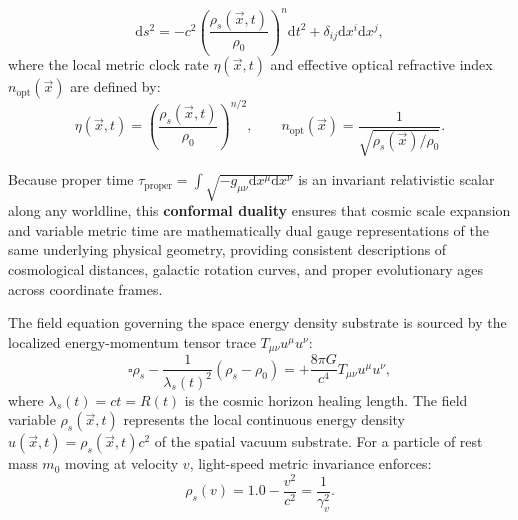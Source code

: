 \documentclass[aps,prd,reprint,superscriptaddress,nofootinbib,floatfix,amsmath,amssymb]{revtex4-2}
\begin{document}
\begin{enumerate}
    \begin{equation}
    \mathrm{d}s^2 = -c^2 \left( \frac{\rho_s(\vec{x}, t)}{\rho_0} \right)^n \mathrm{d}t^2 + \delta_{ij} \mathrm{d}x^i \mathrm{d}x^j,
    \label{eq:metric}
    \end{equation}
    where the local metric clock rate $\eta(\vec{x}, t)$ and effective optical refractive index $n_{\text{opt}}(\vec{x})$ are defined by:
    \begin{equation}
    \eta(\vec{x}, t) = \left(\frac{\rho_s(\vec{x}, t)}{\rho_0}\right)^{n/2}, \qquad n_{\text{opt}}(\vec{x}) = \frac{1}{\sqrt{\rho_s(\vec{x}) / \rho_0}}.
    \label{eq:clock_rate}
    \end{equation}
\end{enumerate}

Because proper time $\tau_{\mathrm{proper}} = \int \sqrt{-g_{\mu\nu}\mathrm{d}x^\mu\mathrm{d}x^\nu}$ is an invariant relativistic scalar along any worldline, this \textbf{conformal duality} ensures that cosmic scale expansion and variable metric time are mathematically dual gauge representations of the same underlying physical geometry, providing consistent descriptions of cosmological distances, galactic rotation curves, and proper evolutionary ages across coordinate frames.

The field equation governing the space energy density substrate is sourced by the localized energy-momentum tensor trace $T_{\mu\nu} u^\mu u^\nu$:
\begin{equation}
\square \rho_s - \frac{1}{\lambda_s(t)^2} (\rho_s - \rho_0) = +\frac{8\pi G}{c^4} T_{\mu\nu} u^\mu u^\nu,
\label{eq:field_eq}
\end{equation}
where $\lambda_s(t) = c t = R(t)$ is the cosmic horizon healing length. The field variable $\rho_s(\vec{x}, t)$ represents the local continuous energy density $u(\vec{x}, t) = \rho_s(\vec{x}, t) c^2$ of the spatial vacuum substrate. For a particle of rest mass $m_0$ moving at velocity $v$, light-speed metric invariance enforces:
\begin{equation}
\rho_s(v) = 1.0 - \frac{v^2}{c^2} = \frac{1}{\gamma_v^2}.
\label{eq:velocity_depression}
\end{equation}
\end{document}
